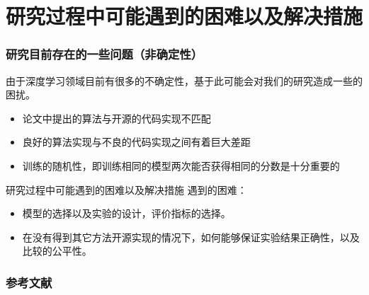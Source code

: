 \documentclass{beamer}
\begin{document}
\section{研究过程中可能遇到的困难以及解决措施}

\begin{frame}[c]\frametitle{研究目前存在的一些问题（非确定性）}
    由于深度学习领域目前有很多的不确定性，基于此可能会对我们的研究造成一些的困扰。
    \begin{itemize}
        \item 论文中提出的算法与开源的代码实现不匹配
        \item 良好的算法实现与不良的代码实现之间有着巨大差距
        \item 训练的随机性，即训练相同的模型两次能否获得相同的分数是十分重要的
    \end{itemize}
\end{frame}

\begin{frame}{研究过程中可能遇到的困难以及解决措施}\pause
    遇到的困难：
    \begin{itemize}
       \item 
       模型的选择以及实验的设计，评价指标的选择。
       \item 
       在没有得到其它方法开源实现的情况下，如何能够保证实验结果正确性，以及比较的公平性。
    \end{itemize}
\end{frame}

\begin{frame}[allowframebreaks]\frametitle{参考文献}
    \scriptsize
    
    
\end{frame}
\end{document}
